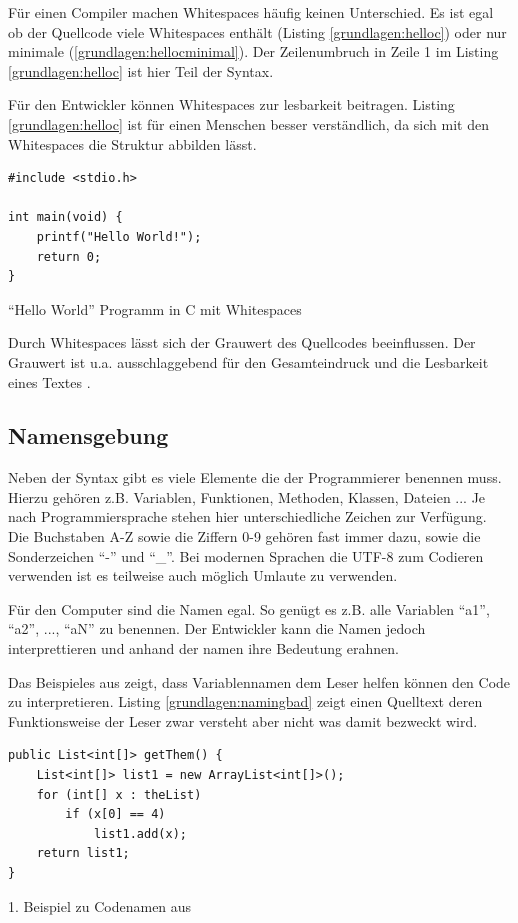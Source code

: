 Für einen Compiler machen Whitespaces häufig keinen Unterschied.
Es ist egal ob der Quellcode viele Whitespaces enthält (Listing \ref{grundlagen:helloc})
oder nur minimale (\ref{grundlagen:hellocminimal}).
Der Zeilenumbruch in Zeile 1 im Listing \ref{grundlagen:helloc} ist hier Teil der Syntax.

Für den Entwickler können Whitespaces zur lesbarkeit beitragen. Listing \ref{grundlagen:helloc}
ist für einen Menschen besser verständlich, da sich mit den Whitespaces die Struktur abbilden lässt.

\begin{listing}[H]
    \begin{verbatim}
#include <stdio.h>

int main(void) {
    printf("Hello World!");
    return 0;
}
    \end{verbatim}
    \caption{\enquote{Hello World} Programm in C mit Whitespaces}
    \label{grundlagen:helloc}
\end{listing}

Durch Whitespaces lässt sich der Grauwert des Quellcodes beeinflussen.
Der Grauwert ist u.a. ausschlaggebend für den Gesamteindruck und die Lesbarkeit
eines Textes \cite{Beinert}.

\subsection{Namensgebung}

Neben der Syntax gibt es viele Elemente die der Programmierer benennen muss.
Hierzu gehören z.B. Variablen, Funktionen, Methoden, Klassen, Dateien ...
Je nach Programmiersprache stehen hier unterschiedliche Zeichen zur Verfügung.
Die Buchstaben A-Z sowie die Ziffern 0-9 gehören fast immer dazu, sowie die
Sonderzeichen \enquote{-} und \enquote{\_}. Bei modernen Sprachen die UTF-8
zum Codieren verwenden ist es teilweise auch möglich Umlaute zu verwenden.

Für den Computer sind die Namen egal. So genügt es z.B. alle Variablen \enquote{a1},
\enquote{a2}, ..., \enquote{aN} zu benennen. Der Entwickler kann die Namen jedoch interprettieren und
anhand der namen ihre Bedeutung erahnen.

Das Beispieles aus \cite[S. 46-47]{Martin} zeigt, dass Variablennamen dem
Leser helfen können den Code zu interpretieren.
Listing \ref{grundlagen:namingbad} zeigt einen Quelltext deren Funktionsweise
der Leser zwar versteht aber nicht was damit bezweckt wird.

\begin{listing}
    \begin{verbatim}
public List<int[]> getThem() {
    List<int[]> list1 = new ArrayList<int[]>();
    for (int[] x : theList)
        if (x[0] == 4)
            list1.add(x);
    return list1;
}
    \end{verbatim}
    \caption{1. Beispiel zu Codenamen aus \cite[S. 46]{Martin}}
    \label{grundlagen:namingbad}
\end{listing}

